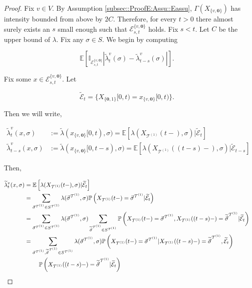 \documentclass[12pt]{article}
\newcommand{\mb}{\mathbb}
\newcommand{\mc}{\mathcal}
\newcommand{\pr}{\mb{P}}							%
\newcommand{\ex}[1]{\mb{E}\left[#1\right]}			%
\renewcommand{\root}{\mathbf{0}}				%
\renewcommand{\v}{v}							%
\renewcommand{\S}{S}							%
\newcommand{\s}{\sigma}							%
\newcommand{\sv}{\vec{\s}}						%
\newcommand{\x}{x}								%
\renewcommand{\t}{t}							%
\renewcommand{\tt}{s}							%
\newcommand{\X}{X}								%
\newcommand{\vind}[1]{^{#1}}					%
\newcommand{\carp}[1]{^{#1}}					%
\newcommand{\vsi}[1]{^{#1}}						%
\newcommand{\cind}[1]{_{#1}}					%
\newcommand{\tp}[1]{(#1)}						%
\newcommand{\tip}[1]{#1}						%
\newcommand{\ts}[1]{_{#1}}						%
\newcommand{\const}{C}							%
\newcommand{\tree}{\mc{T}}						%
\newcommand{\sln}[1]{^{(#1)}}					%
\newcommand{\rate}{\lambda}						%
\newcommand{\alt}[1]{\widetilde{#1}}			%
\newcommand{\evnt}{\mc{E}}						%
\newcommand{\pmap}{\Gamma}						%
\newcommand{\crate}{\alt{\lambda}}				%
\begin{document}
\begin{proof}
Fix \(\v\in V\). By Assumption \ref{subsec::ProofE:Assu::Eassu}, \(\pmap(\X\cind{\{\v,\root\}})\) has intensity bounded from above by \(2\const\). Therefore, for every \(\t > 0\) there almost surely exists an \(\tt\) small enough such that \(\evnt^{\{\v,\root\}}_{\tt,\t}\) holds. Fix \(\tt < \t\). Let \(\const\) be the upper bound of \(\rate\). Fix any \(\s\in \S\). We begin by computing

\[\ex{\mb{I}_{\evnt^{\{\v,\root\}}_{\tt,\t}}|\crate\vind{\v}\ts{\t}(\s) - \crate\vind{\v}\ts{\t-\tt}(\s)|}.\]

Fix some \(\x\in \evnt^{\{\v,\root\}}_{\tt,\t}\). Let 

\[\alt{\evnt}\ts{\t} = \{\X\cind{\{\root,1\}}\tip{[0,\t)} = \x\cind{\{\v,\root\}}\tip{[0,\t)}\}.\]

Then we will write,

\begin{align*}
\crate\vind{\v}\ts{\t}(\x,\s) &:=\crate(\x\cind{\{\v,\root\}}\tip{[0,\t)},\s) = \ex{\rate(\X\cind{\tree\sln{1}}\tp{\t-},\s)|\alt{\evnt}\ts{\t}}\\
\crate\vind{\v}\ts{\t-\tt}(\x,\s) &:= \crate(\x\cind{\{\v,\root\}}\tip{[0,\t-\tt)},\s) = \ex{\rate(\X\cind{\tree\sln{1}}\tp{(\t-\tt)-},\s)|\alt{\evnt}\ts{\t-\tt}}
\end{align*}

Then,

\begin{align*}
\crate\vind{\v}\ts{\t}(\x,\s) &= \ex{\rate(\X\cind{\tree\sln{1}}\tp{\t-},\s)|\alt{\evnt}\ts{\t}}\\
&= \sum_{\sv\vsi{\tree\sln{1}} \in \S\carp{\tree\sln{1}}} \rate(\sv\vsi{\tree\sln{1}},\s)\pr\left(\X\cind{\tree\sln{1}}\tp{\t-} = \sv\vsi{\tree\sln{1}}|\alt{\evnt}\ts{\t}\right)\\
&= \sum_{\sv\vsi{\tree\sln{1}} \in \S\carp{\tree\sln{1}}} \rate(\sv\vsi{\tree\sln{1}},\s) \sum_{\alt{\sv}\vsi{\tree\sln{1}} \in \S\carp{\tree\sln{1}}} \pr\left(\X\cind{\tree\sln{1}}\tp{\t-} = \sv\vsi{\tree\sln{1}},\X\cind{\tree\sln{1}}\tp{(\t-\tt)-} = \alt{\sv}\vsi{\tree\sln{1}}|\alt{\evnt}\ts{\t}\right)\\
&= \sum_{\sv\vsi{\tree\sln{1}},\alt{\sv}\vsi{\tree\sln{1}} \in \S\carp{\tree\sln{1}}} \rate(\sv\vsi{\tree\sln{1}},\s)\pr\left(\X\cind{\tree\sln{1}}\tp{\t-} = \sv\vsi{\tree\sln{1}}|\X\cind{\tree\sln{1}}\tp{(\t-\tt)-}=\alt{\sv}\vsi{\tree\sln{1}},\alt{\evnt}\ts{\t}\right)\\
&\hspace{24 pt}\pr\left(\X\cind{\tree\sln{1}}\tp{(\t-\tt)-}=\alt{\sv}\vsi{\tree\sln{1}}|\alt{\evnt}\ts{\t}\right)\\
\end{align*}


\end{proof}
\end{document}
